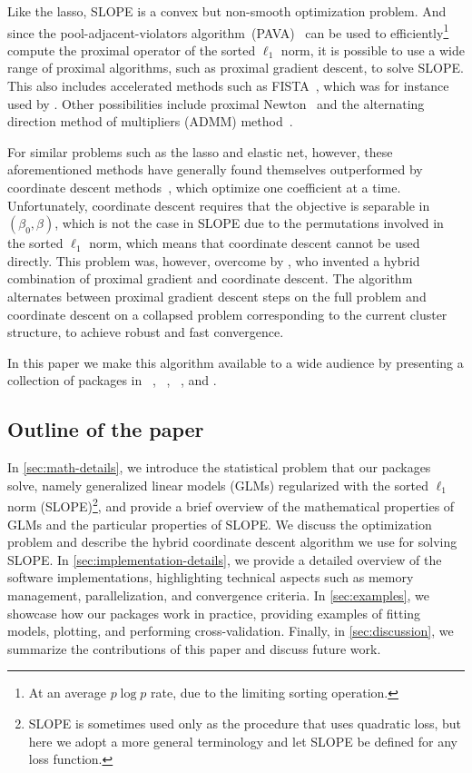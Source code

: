 \documentclass[article]{jss}
\begin{document}
Like the lasso, SLOPE is a convex but non-smooth optimization problem. And since the
pool-adjacent-violators algorithm~(PAVA)~\citep{barlow1972} can be used to
efficiently\footnote{At an average \(p \log p\) rate, due to the limiting
  sorting operation.} compute the proximal operator of the sorted \(\ell_1\)
norm, it is possible to use a wide range of proximal algorithms, such
as proximal gradient descent, to solve SLOPE. This also includes accelerated
methods such as FISTA~\citep{beck2009}, which was for instance used by
\citet{bogdan2015}. Other possibilities include proximal Newton~\citep{lee2014}
and the alternating direction method of multipliers (ADMM) method~\citep{boyd2010}.

For similar problems such as the lasso and
elastic net\citep{zou2005}, however, these
aforementioned methods have generally found themselves outperformed by coordinate
descent methods~\citep{friedman2007,friedman2010}, which optimize one
coefficient at a time. Unfortunately, coordinate descent requires that the
objective is separable in \((\beta_0, \beta)\), which is not the case in SLOPE
due to the permutations involved in the sorted \(\ell_1\) norm, which means
that coordinate descent cannot be used directly. This problem was, however,
overcome by \citet{larsson2023}, who invented a hybrid combination of proximal
gradient and coordinate descent. The algorithm alternates between proximal gradient
descent steps on the full problem and coordinate descent on a collapsed
problem corresponding to the current cluster structure, to achieve
robust and fast convergence.

In this paper we make this algorithm available to a wide audience by
presenting a collection of packages in ~\citep{rcoreteam2025},
~\citep{pythonsoftwarefoundation2025},
~\citep{bezanson2017}, and .

\subsection{Outline of the paper}

In \autoref{sec:math-details}, we introduce the statistical problem that our
packages solve, namely generalized linear models (GLMs) regularized with the sorted
\(\ell_1\) norm (SLOPE)\footnote{SLOPE is sometimes used only as the procedure
  that uses quadratic loss, but here we adopt a more general terminology and
  let SLOPE be defined for any loss function.}, and provide a brief overview of
the mathematical properties of GLMs and the particular properties of SLOPE.
We discuss the optimization problem and describe the hybrid
coordinate descent algorithm we use for solving SLOPE.
In \autoref{sec:implementation-details}, we provide a detailed overview of the
software implementations, highlighting technical aspects such as
memory management, parallelization, and convergence criteria.
In \autoref{sec:examples}, we showcase how our packages work in practice,
providing examples of fitting models, plotting, and performing cross-validation.
Finally, in \autoref{sec:discussion}, we summarize the contributions of this paper
and discuss future work.
\end{document}
